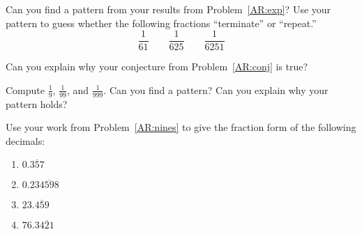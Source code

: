 \begin{prob}\label{AR:conj}
Can you find a pattern from your results from Problem~\ref{AR:exp}?
Use your pattern to guess whether the following fractions
``terminate'' or ``repeat.''
\[
\dfrac{1}{61}\qquad \dfrac{1}{625} \qquad \dfrac{1}{6251}
\]
\end{prob}


\begin{prob}
Can you explain why your conjecture from Problem~\ref{AR:conj} is
true?
\end{prob}


\begin{prob}\label{AR:nines} 
Compute $\frac{1}{9}$, $\frac{1}{99}$, and $\frac{1}{999}$. Can you
find a pattern? Can you explain why your pattern holds?
\end{prob}


\begin{prob}
Use your work from Problem~\ref{AR:nines} to give the fraction form of
the following decimals:
\begin{enumerate}
\item $0.\overline{357}$
\item $0.23\overline{4598}$
\item $23.\overline{459}$
\item $76.3\overline{421}$
\end{enumerate}
\end{prob}

